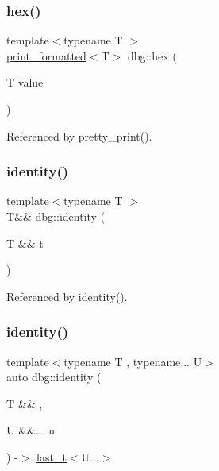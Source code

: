 \mbox{\label{namespacedbg_afe9f0e1588144f8bb978cdc78d346682}} 
\subsubsection{\texorpdfstring{hex()}{hex()}}
{\footnotesize\ttfamily template$<$typename T $>$ \\
\hyperlink{structdbg_1_1print__formatted}{print\+\_\+formatted}$<$T$>$ dbg\+::hex (\begin{DoxyParamCaption}\item[{T}]{value }\end{DoxyParamCaption})}



Referenced by pretty\+\_\+print().

\mbox{\label{namespacedbg_a23f10decf1edf2d34e226437e5562452}} 
\subsubsection{\texorpdfstring{identity()}{identity()}\hspace{0.1cm}{\footnotesize\ttfamily [1/2]}}
{\footnotesize\ttfamily template$<$typename T $>$ \\
T\&\& dbg\+::identity (\begin{DoxyParamCaption}\item[{T \&\&}]{t }\end{DoxyParamCaption})}



Referenced by identity().

\mbox{\label{namespacedbg_a2f87ce2acfce330c46dba7f4c62c2fb8}} 
\subsubsection{\texorpdfstring{identity()}{identity()}\hspace{0.1cm}{\footnotesize\ttfamily [2/2]}}
{\footnotesize\ttfamily template$<$typename T , typename... U$>$ \\
auto dbg\+::identity (\begin{DoxyParamCaption}\item[{T \&\&}]{,  }\item[{U \&\&...}]{u }\end{DoxyParamCaption}) -\/$>$ \hyperlink{namespacedbg_a4754c7365d6eb31696a4613230e21ac4}{last\+\_\+t}$<$U...$>$ }

